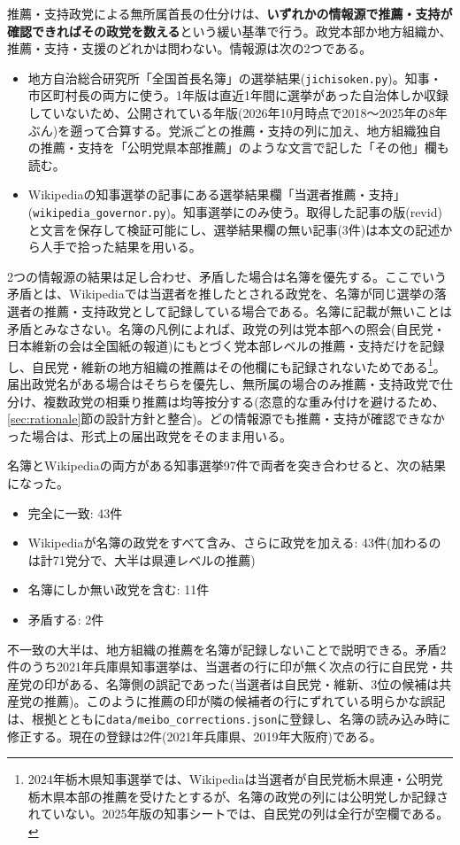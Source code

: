 \documentclass[a4paper,11pt]{ltjsarticle}
\begin{document}
推薦・支持政党による無所属首長の仕分けは、\textbf{いずれかの情報源で推薦・支持が確認できればその政党を数える}という緩い基準で行う。政党本部か地方組織か、推薦・支持・支援のどれかは問わない。情報源は次の2つである。
\begin{itemize}
  \item 地方自治総合研究所「全国首長名簿」の選挙結果(\texttt{jichisoken.py})。知事・市区町村長の両方に使う。1年版は直近1年間に選挙があった自治体しか収録していないため、公開されている年版(2026年10月時点で2018〜2025年の8年ぶん)を遡って合算する。党派ごとの推薦・支持の列に加え、地方組織独自の推薦・支持を「公明党県本部推薦」のような文言で記した「その他」欄も読む。
  \item Wikipediaの知事選挙の記事にある選挙結果欄「当選者推薦・支持」(\texttt{wikipedia\_governor.py})。知事選挙にのみ使う。取得した記事の版(revid)と文言を保存して検証可能にし、選挙結果欄の無い記事(3件)は本文の記述から人手で拾った結果を用いる。
\end{itemize}
2つの情報源の結果は足し合わせ、矛盾した場合は名簿を優先する。ここでいう矛盾とは、Wikipediaでは当選者を推したとされる政党を、名簿が同じ選挙の落選者の推薦・支持政党として記録している場合である。名簿に記載が無いことは矛盾とみなさない。名簿の凡例によれば、政党の列は党本部への照会(自民党・日本維新の会は全国紙の報道)にもとづく党本部レベルの推薦・支持だけを記録し、自民党・維新の地方組織の推薦はその他欄にも記録されないためである\footnote{2024年栃木県知事選挙では、Wikipediaは当選者が自民党栃木県連・公明党栃木県本部の推薦を受けたとするが、名簿の政党の列には公明党しか記録されていない。2025年版の知事シートでは、自民党の列は全行が空欄である。}。届出政党名がある場合はそちらを優先し、無所属の場合のみ推薦・支持政党で仕分け、複数政党の相乗り推薦は均等按分する(恣意的な重み付けを避けるため、\ref{sec:rationale}節の設計方針と整合)。どの情報源でも推薦・支持が確認できなかった場合は、形式上の届出政党をそのまま用いる。

名簿とWikipediaの両方がある知事選挙97件で両者を突き合わせると、次の結果になった。
\begin{itemize}
  \item 完全に一致: 43件
  \item Wikipediaが名簿の政党をすべて含み、さらに政党を加える: 43件(加わるのは計71党分で、大半は県連レベルの推薦)
  \item 名簿にしか無い政党を含む: 11件
  \item 矛盾する: 2件
\end{itemize}
不一致の大半は、地方組織の推薦を名簿が記録しないことで説明できる。矛盾2件のうち2021年兵庫県知事選挙は、当選者の行に印が無く次点の行に自民党・共産党の印がある、名簿側の誤記であった(当選者は自民党・維新、3位の候補は共産党の推薦)。このように推薦の印が隣の候補者の行にずれている明らかな誤記は、根拠とともに\texttt{data/meibo\_corrections.json}に登録し、名簿の読み込み時に修正する。現在の登録は2件(2021年兵庫県、2019年大阪府)である。
\end{document}
